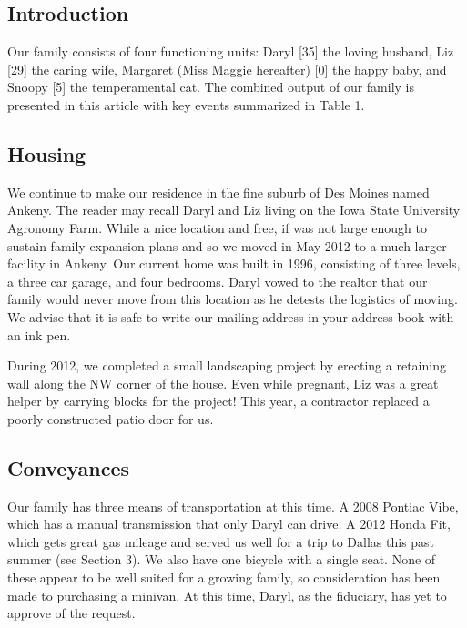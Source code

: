 \documentclass{article}
\begin{document}
\begin{multicols}{2}

\section{Introduction}
Our family consists of four functioning units:  Daryl [35] the loving
husband, Liz [29] the caring wife, Margaret (Miss Maggie hereafter) [0] 
the happy baby, and Snoopy [5] the temperamental cat.  The combined output
of our family is presented in this article with key events summarized in
Table 1.

\subsection{Housing}

We continue to make our residence in the fine suburb of Des Moines 
named Ankeny.  The reader may recall Daryl and Liz living on the
Iowa State University Agronomy Farm.  While a nice location and free,
if was not large enough to sustain family expansion plans and so we moved 
in May 2012 to a much larger facility in Ankeny.  Our current home 
was built in 1996, consisting of three levels, a three car garage, and
four bedrooms.  Daryl vowed to the realtor that our family would never
move from this location as he detests the logistics of moving.  We advise that it is safe to write our mailing
address in your address book with an ink pen.

During 2012, we completed a small landscaping project by erecting a 
retaining wall along the NW corner of the house.  Even while pregnant,
Liz was a great helper by carrying blocks for the project!  This year, 
a contractor replaced a poorly constructed patio door for us.

\subsection{Conveyances}

Our family has three means of transportation at this time.  A 2008 Pontiac 
Vibe, which has a manual transmission that only Daryl can drive.  A 2012 
Honda Fit, which gets great gas mileage and served us well for a trip to
Dallas this past summer (see Section 3).  We also have one bicycle with a single seat.
None of these appear to be well suited for a growing family, so consideration
has been made to purchasing a minivan.  At this time, Daryl, as the fiduciary,
has yet to approve of the request.


\end{multicols}
\end{document}
